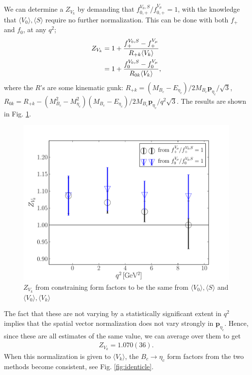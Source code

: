 We can determine a $Z_{V_k}$ by demanding that $f_{0,+}^{V_0,S}/f_{0,+}^{V_{\mu}}=1$, with the knowledge that $\langle V_0 \rangle, \langle S \rangle$ require no further normalization. This can be done with both $f_+$ and $f_0$, at any $q^2$;
\begin{align}
	Z_{V_k} &= 1 + {f_+^{V_0,S} - f_+^{V_{\mu}} \over R_{+k} \langle V_k \rangle }  \\
	&= 1 + {f_0^{V_0,S} - f_0^{V_{\mu}} \over R_{0k} \langle V_k \rangle },
\end{align}
where the $R$'s are some kinematic gunk: $R_{+k} = ( M_{B_c} - E_{\eta_c} )/2M_{B_c}{\textbf{p}}_{\eta_c}/\sqrt{3}$, \\ $R_{0k} = R_{+k} - {( M_{B_c}^2-M_{\eta_c}^2 )(M_{B_c}-E_{\eta_c})/2M_{B_c} {\textbf{p}}_{\eta_c}/q^2\sqrt{3}}$. The results are shown in Fig. \ref{fig:ZVk}.
\begin{figure}[htb!]
\centering
\includegraphics[scale=0.5]{images/nrqcd/ZVk.pdf}
\caption{$Z_{V_k}$ from constraining form factors to be the same from $\langle V_0 \rangle,\langle S \rangle$ and $\langle V_0 \rangle,\langle V_k \rangle$}
\label{fig:ZVk}
\end{figure}
The fact that these are not varying by a statistically significant extent in $q^2$ implies that the spatial vector normalization does not vary strongly in ${\textbf{p}}_{\eta_c}$. Hence, since these are all estimates of the same value, we can average over them to get
\begin{align}
	Z_{V_k} = 1.070(36).
\end{align}
When this normalization is given to $\langle V_k \rangle$, the $B_c\to\eta_c$ form factors from the two methods become consistent, see Fig. \ref{fig:identicle}.

